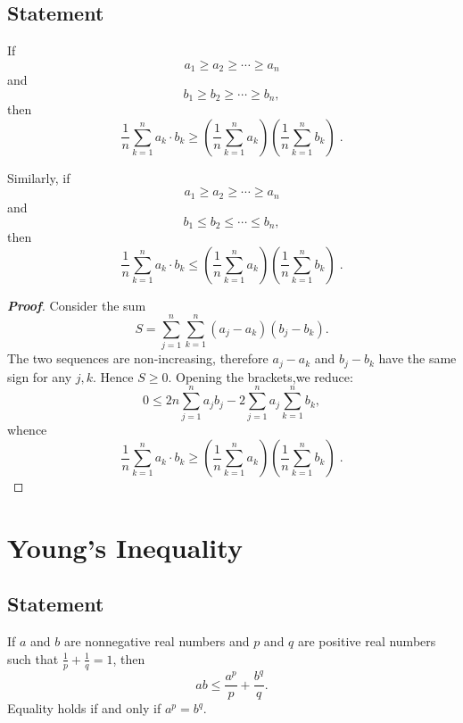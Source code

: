 \documentclass[a4paper]{report}
\begin{document}
\section{Statement}
\begin{thr}

 If
\[a_1\geqslant a_2\geqslant\cdots\geqslant a_n\]
and
\[b_1\geqslant b_2\geqslant\cdots\geqslant b_n,\]
then
\begin{equation}
  \frac{1}{n}\sum_{k=1}^{n}a_k\cdot b_k\geqslant
  \left(\frac{1}{n}\sum_{k=1}^{n}a_k\right)
  \left(\frac{1}{n}\sum_{k=1}^{n}b_k\right)\; .
\end{equation}  

Similarly, if 
\[a_1\geqslant a_2\geqslant\cdots\geqslant a_n\]
and
\[b_1\leqslant b_2\leqslant\cdots\leqslant b_n,\]
then
\begin{equation}
\frac{1}{n}\sum_{k=1}^{n}a_k\cdot b_k\leqslant
\left(\frac{1}{n}\sum_{k=1}^{n}a_k\right)
\left(\frac{1}{n}\sum_{k=1}^{n}b_k\right)\; .
\end{equation} 

\end{thr}
\begin{proof}[\bf{Proof}]
	                                       
	Consider the sum
	\[S=\sum_{j=1}^n\sum_{k=1}^{n}(a_j-a_k)(b_j-b_k).\]
	The two sequences are non-increasing, therefore $a_j-a_k$ and $b_j-b_k$ 
	have the same sign for any $j, k$. Hence $S\geqslant0$.
	Opening the brackets,we reduce:
	\[0\leqslant2n\sum_{j=1}^{n}a_jb_j-2\sum_{j=1}^{n}a_j\sum_{k=1}^{n}b_k,\]
	whence
	\[\frac{1}{n}\sum_{k=1}^{n}a_k\cdot b_k\geqslant
	\left(\frac{1}{n}\sum_{k=1}^{n}a_k\right)
	\left(\frac{1}{n}\sum_{k=1}^{n}b_k\right)\; .\]
	
\end{proof}


\chapter{Young's Inequality}
\section{Statement}
\begin{thr}
If $a$ and $b$ are nonnegative real numbers and $p$ and $q$ are positive real numbers such that $\frac{1}{p}+\frac{1}{q}=1$, then
\begin{equation}
ab\leqslant\frac{a^p}{p}+\frac{b^q}{q}.
\end{equation}
Equality holds if and only if $\displaystyle a^p=b^q$.
\end{thr}
\end{document}
